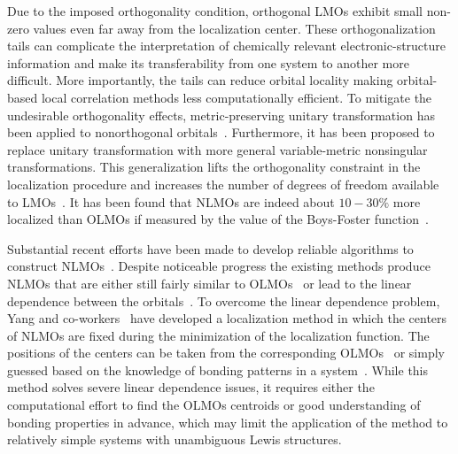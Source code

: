 \documentclass[aps,prl,reprint,amsmath,amssymb]{revtex4-1}
\begin{document}
Due to the imposed orthogonality condition, orthogonal LMOs exhibit small non-zero values even far away from the localization center. 
These orthogonalization tails can complicate the interpretation of chemically relevant electronic-structure information and make its transferability from one system to another more difficult. 
More importantly, the tails can reduce orbital locality making orbital-based local correlation methods less computationally efficient.
To mitigate the undesirable orthogonality effects, metric-preserving unitary transformation has been applied to nonorthogonal orbitals~\cite{hoyvik2017generalising}. 
Furthermore, it has been proposed to replace unitary transformation with more general variable-metric nonsingular transformations. 
This generalization lifts the orthogonality constraint in the localization procedure and increases the number of degrees of freedom available to LMOs~\cite{anderson1968self, diner1968fully, magnasco1974localized, payne1977hartree, mehler1977self, feng2004An_efficient, cui2010efficient}. 
It has been found that NLMOs are indeed about $10-30 \%$ more localized than OLMOs if measured by the value of the Boys-Foster function~\cite{feng2004An_efficient, liu2000nonorthogonal}. 

Substantial recent efforts have been made to develop reliable algorithms to construct NLMOs~\cite{feng2004An_efficient, liu2000nonorthogonal, peng2013effective, hoyvik2017generalising}. 
Despite noticeable progress the existing methods produce NLMOs that are either still fairly similar to OLMOs~\cite{sundberg1979variationally} or lead to the linear dependence between the orbitals~\cite{feng2004An_efficient}. 
To overcome the linear dependence problem, Yang and co-workers~\cite{feng2004An_efficient, cui2010efficient} have developed a localization method in which the centers of NLMOs are fixed during the minimization of the localization function. 
The positions of the centers can be taken from the corresponding OLMOs~\cite{feng2004An_efficient} or simply guessed based on the knowledge of bonding patterns in a system~\cite{cui2010efficient}. %
While this method solves severe linear dependence issues, it requires either the computational effort to find the OLMOs centroids or good understanding of bonding properties in advance, which may limit the application of the method to relatively simple systems with unambiguous Lewis structures.
\end{document}
